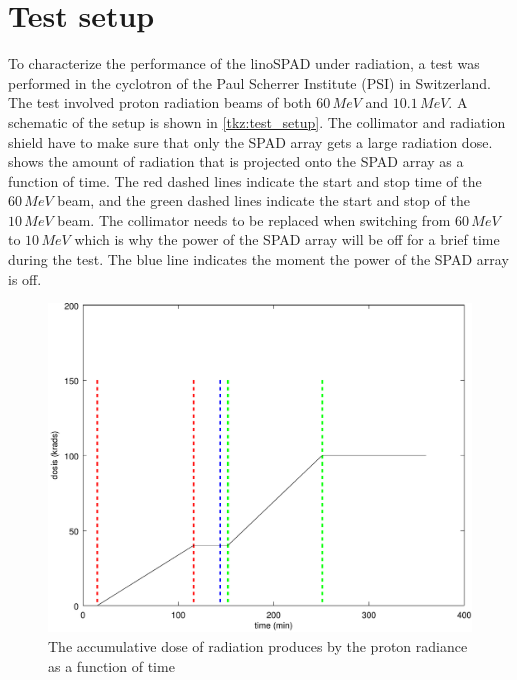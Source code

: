 \section{Test setup}\label{ssec:test_setup}
To characterize the performance of the linoSPAD under radiation, a test was performed in the cyclotron of the Paul Scherrer Institute (PSI) in Switzerland. The test involved proton radiation beams of both $60\,MeV$ and $10.1\,MeV$. A schematic of the setup is shown in \cref{tkz:test_setup}. The collimator and radiation shield have to make sure that only the SPAD array gets a large radiation dose.  shows the amount of radiation that is projected onto the SPAD array as a function of time. The red dashed lines indicate the start and stop time of the $60\,MeV$ beam, and the green dashed lines indicate the start and stop of the $10\,MeV$ beam. The collimator needs to be replaced when switching from $60\,MeV$ to $10\,MeV$ which is why the power of the SPAD array will be off for a brief time during the test. The blue line indicates the moment the power of the SPAD array is off.






\begin{figure}[h]
\centering
	\includegraphics[width=0.6\linewidth]{fig/dosis.pdf}
\caption{The accumulative dose of radiation produces by the proton radiance as a function of time}
\label{fig:dosis}
\end{figure}


